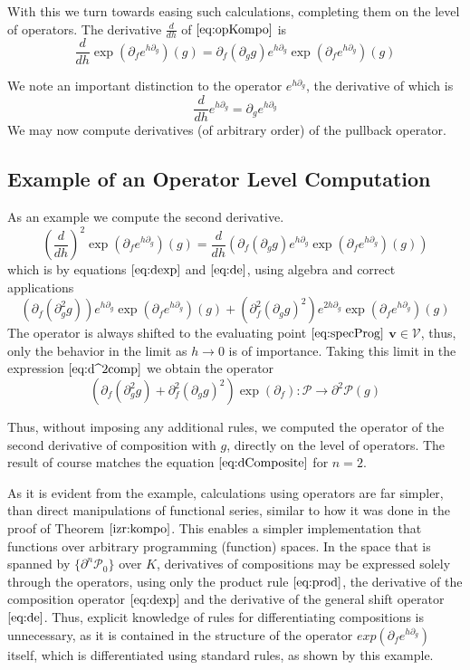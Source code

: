 \documentclass[11pt]{article}
\newcommand{\VV}{\mathcal{V}}
\newcommand{\vv}{\mathbf{v}}
\newcommand{\dP}{\mathcal{P}}
\newcommand{\D}{\partial}
\begin{document}
With this we turn towards easing such calculations, completing them on
the level of operators. The derivative $\frac{d}{dh}$ of $\eqref{eq:opKompo}$ is 
 \begin{equation}\label{eq:dexp}
 \frac{d}{dh}\exp(\D_fe^{h\D_g})(g)=\D_f(\D_gg)e^{h\D_g}\exp(\D_fe^{h\D_g})(g)
 \end{equation}
 
 We note an important distinction to the operator $e^{h\D_g}$, the derivative of which is
 \begin{equation}\label{eq:de}
\frac{d}{dh}e^{h\D_g}=\D_ge^{h\D_g}
 \end{equation}
 We may now compute derivatives (of arbitrary order) of the pullback operator.
\subsection{Example of an Operator Level Computation}\label{sec:example}
 As an example we compute the second derivative.
 $$\left(\frac{d}{dh}\right)^2\exp\left(\D_fe^{h\D_g}\right)(g)=\frac{d}{dh}\left(\D_f(\D_gg)e^{h\D_g}\exp\left(\D_fe^{h\D_g}\right)(g)\right)$$
 which is by equations $\eqref{eq:dexp}$ and $\eqref{eq:de}$, using algebra and correct applications
 \begin{equation}\label{eq:d^2comp}
 \left(\D_f(\D^2_gg)\right)e^{h\D_g}\exp(\D_fe^{h\D_g})(g)+(\D^2_f(\D_gg)^2)e^{2h\D_g}\exp(\D_fe^{h\D_g})(g)
 \end{equation}
 The operator is always shifted to the evaluating point $\eqref{eq:specProg}$ $\vv\in \VV$, thus, only the behavior in the limit as $h\to 0$ is of importance. Taking this limit in the expression $\eqref{eq:d^2comp}$ we obtain the operator
 \begin{equation*}
	\left(\D_f(\D^2_gg)+\D^2_f(\D_gg)^2\right)\exp(\D_f):\dP\to\D^2\dP(g)
 \end{equation*}
 
 Thus, without imposing any additional rules, we computed the operator of the second derivative of composition with $g$, directly on the level of operators. The result of course matches the equation $\eqref{eq:dComposite}$ for $n=2$.
 
 As it is evident from the example, calculations using operators are far
 simpler, than direct manipulations of functional series, similar to how it was done in the
 proof of Theorem $\ref{izr:kompo}$. This enables a simpler
 implementation that functions over arbitrary programming (function) spaces. In
 the space that is spanned by $\{\D^n\dP_0\}$ over $K$, derivatives of
 compositions may be expressed solely through the operators, using only the
 product rule $\eqref{eq:prod}$, the derivative of the composition operator
 $\eqref{eq:dexp}$ and the derivative of the general shift operator
 $\eqref{eq:de}$. Thus, explicit knowledge of rules for differentiating
 compositions is unnecessary, as it is contained in the structure of the
 operator $exp(\D_fe^{h\D_g})$ itself, which is differentiated using standard
 rules, as shown by this example. 
\end{document}
